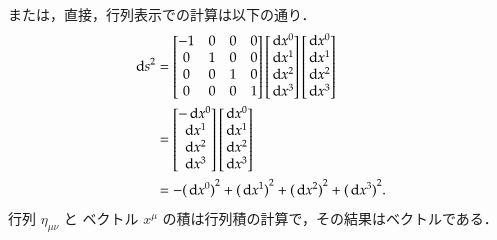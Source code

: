     または，直接，行列表示での計算は以下の通り．
    \begin{align*}
        {\,\mathrm{d}s}^{2} &= \begin{bmatrix}
                           -1 & 0 & 0 & 0 \\
                            0 & 1 & 0 & 0 \\
                            0 & 0 & 1 & 0 \\
                            0 & 0 & 0 & 1
                       \end{bmatrix}
                       \begin{bmatrix}
                           \,\mathrm{d} x^{0} \\
                           \,\mathrm{d} x^{1} \\
                           \,\mathrm{d} x^{2} \\
                           \,\mathrm{d} x^{3}
                       \end{bmatrix}
                       \begin{bmatrix}
                           \,\mathrm{d} x^{0} \\
                           \,\mathrm{d} x^{1} \\
                           \,\mathrm{d} x^{2} \\
                           \,\mathrm{d} x^{3}
                       \end{bmatrix} \\
                    &=  \begin{bmatrix}
                            - \,\mathrm{d} x^{0} \\
                              \,\mathrm{d} x^{1} \\
                              \,\mathrm{d} x^{2} \\
                              \,\mathrm{d} x^{3}
                        \end{bmatrix}
                        \begin{bmatrix}
                              \,\mathrm{d} x^{0} \\
                              \,\mathrm{d} x^{1} \\
                              \,\mathrm{d} x^{2} \\
                              \,\mathrm{d} x^{3}
                        \end{bmatrix} \\
                    &= - {(\,\mathrm{d} x^{0})}^{2} + {(\,\mathrm{d} x^{1})}^{2} + {(\,\mathrm{d} x^{2})}^{2} + {(\,\mathrm{d} x^{3})}^{2}.
    \end{align*}
    行列 $\eta_{\mu\nu}$ と ベクトル $x^{\mu}$ の積は行列積の計算で，その結果はベクトルである．
